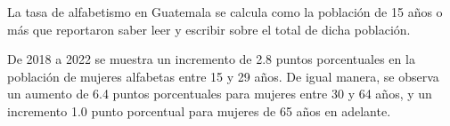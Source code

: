 La tasa de alfabetismo en Guatemala se calcula como la población de 15 años o más que reportaron saber leer y escribir sobre el total de dicha población.

De 2018 a 2022 se muestra un incremento de 2.8 puntos porcentuales en la población de mujeres alfabetas entre 15 y 29 años. De igual manera, se observa un aumento de 6.4 puntos porcentuales para mujeres entre 30 y 64 años, y un incremento 1.0 punto porcentual para mujeres de 65 años en adelante. 